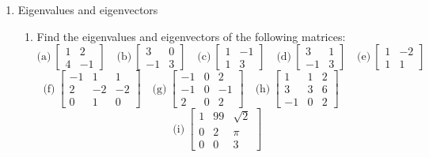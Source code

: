 \documentclass[11pt]{article}
\begin{document}
\begin{enumerate}
  \item Eigenvalues and eigenvectors
    \begin{enumerate}
      \item Find the eigenvalues and eigenvectors of the following matrices:
        \[
          \text{(a)}\
          \begin{bmatrix}
            1 & 2 \\ 4 &-1
          \end{bmatrix}
          \quad
          \text{(b)}\
          \begin{bmatrix}
            3 & 0 \\ -1 & 3
          \end{bmatrix}
          \quad
          \text{(c)}\
          \begin{bmatrix}
            1 & -1 \\ 1 & 3
          \end{bmatrix}
          \quad
          \text{(d)}\
          \begin{bmatrix}
            3 & 1 \\
            -1 & 3
          \end{bmatrix}
          \quad
          \text{(e)}\
          \begin{bmatrix}
            1 & -2 \\
            1 & 1
          \end{bmatrix}
        \]
        \[
          \text{(f)}\
          \begin{bmatrix}
            -1&1&1\\ 2&-2&-2\\ 0&1&0
          \end{bmatrix}
          \quad
          \text{(g)}\
          \begin{bmatrix}
            -1&0&2\\ -1&0&-1\\ 2&0&2
          \end{bmatrix}
          \quad
          \text{(h)}\
          \begin{bmatrix}
            1&1&2\\ 3&3&6\\ -1&0&2
          \end{bmatrix}
          \hspace{2cm}
        \]
        \[
          \text{(i)}\
          \begin{bmatrix}
            1&99&\sqrt{2}\\ 0&2&\pi\\ 0&0&3

\end{bmatrix}\]
\end{enumerate}
\end{enumerate}
\end{document}
